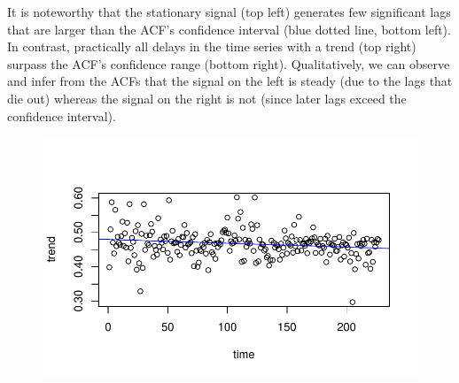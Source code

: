 \documentclass[
  letterpaper,
  DIV=11,
  numbers=noendperiod]{scrartcl}
\newenvironment{Shaded}{\begin{snugshade}}{\end{snugshade}}
\newcommand{\AttributeTok}[1]{\textcolor[rgb]{0.40,0.45,0.13}{#1}}
\newcommand{\DecValTok}[1]{\textcolor[rgb]{0.68,0.00,0.00}{#1}}
\newcommand{\FunctionTok}[1]{\textcolor[rgb]{0.28,0.35,0.67}{#1}}
\newcommand{\NormalTok}[1]{\textcolor[rgb]{0.00,0.23,0.31}{#1}}
\newcommand{\OtherTok}[1]{\textcolor[rgb]{0.00,0.23,0.31}{#1}}
\newcommand{\SpecialCharTok}[1]{\textcolor[rgb]{0.37,0.37,0.37}{#1}}
\newcommand{\StringTok}[1]{\textcolor[rgb]{0.13,0.47,0.30}{#1}}
\begin{document}
It is noteworthy that the stationary signal (top left) generates few
significant lags that are larger than the ACF's confidence interval
(blue dotted line, bottom left). In contrast, practically all delays in
the time series with a trend (top right) surpass the ACF's confidence
range (bottom right). Qualitatively, we can observe and infer from the
ACFs that the signal on the left is steady (due to the lags that die
out) whereas the signal on the right is not (since later lags exceed the
confidence interval).

\begin{Shaded}
\end{Shaded}

\begin{Shaded}
\end{Shaded}

\begin{figure}[H]

{\centering \includegraphics{Quarto_files/figure-pdf/unnamed-chunk-19-1.pdf}

}

\end{figure}
\end{document}
